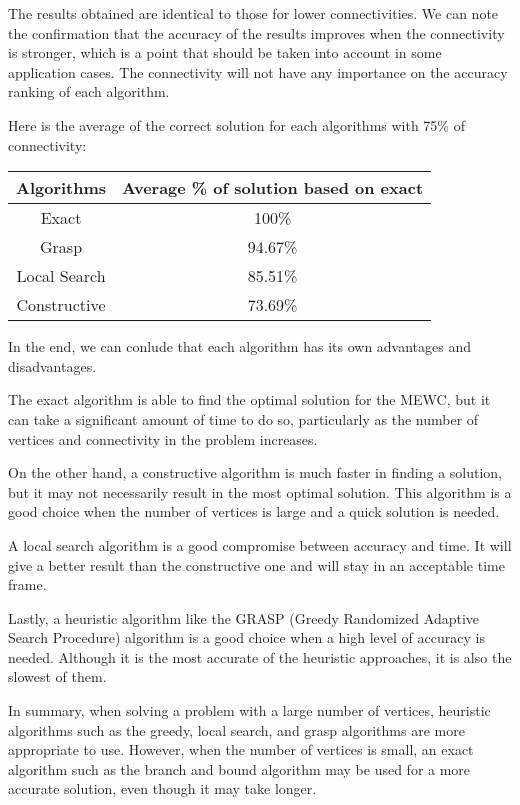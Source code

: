 The results obtained are identical to those for lower connectivities. We can note the confirmation that the accuracy of the results improves when the connectivity is stronger, which is a point that should be taken into account in some application cases. The connectivity will not have any importance on the accuracy ranking of each algorithm. \bigskip

Here is the average of the correct solution for each algorithms with 75\% of connectivity: \bigskip

\begin{center}
    \begin{tabular}{|c|c|}
        \hline
        \textbf{Algorithms} & \textbf{Average \% of solution based on exact}                         \\
        \hline
        Exact & 100\% \\
        Grasp & 94.67\% \\
        Local Search & 85.51\% \\
        Constructive & 73.69\% \\
        \hline
    \end{tabular}
\end{center}

In the end, we can conlude that each algorithm has its own advantages and disadvantages. \bigskip

The exact algorithm is able to find the optimal solution for the MEWC, but it can take a significant amount of time to do so, particularly as the number of vertices and connectivity in the problem increases. \bigskip

On the other hand, a constructive algorithm is much faster in finding a solution, but it may not necessarily result in the most optimal solution. This algorithm is a good choice when the number of vertices is large and a quick solution is needed. \bigskip

A local search algorithm is a good compromise between accuracy and time. It will give a better result than the constructive one and will stay in an acceptable time frame. \bigskip

Lastly, a heuristic algorithm like the GRASP (Greedy Randomized Adaptive Search Procedure) algorithm is a good choice when a high level of accuracy is needed. Although it is the most accurate of the heuristic approaches, it is also the slowest of them. \bigskip

In summary, when solving a problem with a large number of vertices, heuristic algorithms such as the greedy, local search, and grasp algorithms are more appropriate to use. 
\newpage However, when the number of vertices is small, an exact algorithm such as the branch and bound algorithm may be used for a more accurate solution, even though it may take longer. \bigskip
